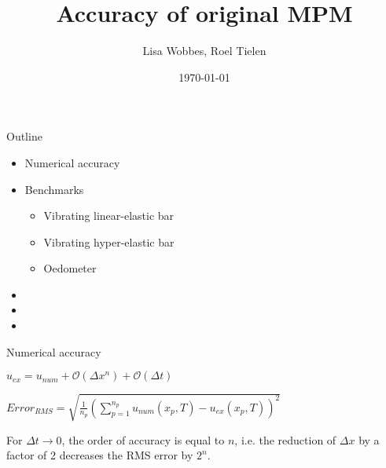\documentclass{beamer}
\title[Accuracy of original MPM]{Accuracy of original MPM}
\author[]{Lisa Wobbes, Roel Tielen}
\date[\today]{\today}
\begin{document}
{
\frame{\titlepage}
}

\begin{frame}{Outline}
\begin{itemize}
\item Numerical accuracy
\item Benchmarks
	\begin{itemize}
	\item Vibrating linear-elastic bar 
	\item Vibrating hyper-elastic bar
	\item Oedometer
	\end{itemize}
\item
\item
\item
\end{itemize}
\end{frame}

\begin{frame}{Numerical accuracy}
\begin{tcolorbox}[colback=red!5,colframe=red!50!black,title=Numerical Approximation]
$u_{ex} = u_{num} + \mathcal{O}(\Delta x^n) + \mathcal{O}(\Delta t)$ %
\end{tcolorbox}
\begin{tcolorbox}[colback=red!5,colframe=red!50!black,title=RMS Error]
$Error_{RMS} = \sqrt{\frac{1}{n_p} \left(\sum_{p=1}^{n_p}u_{num}(x_p,T) - u_{ex}(x_p,T)\right)^2}$
\end{tcolorbox}
\begin{tcolorbox}[colback=blue!5,colframe=blue!40!black,title=Accuracy in displacement]
For $\Delta t \to 0$, the order of accuracy is equal to $n$, i.e. the reduction of $\Delta x$ by a factor of 2 decreases the RMS error by $2^n$.
\end{tcolorbox}
\end{frame}
\end{document}
